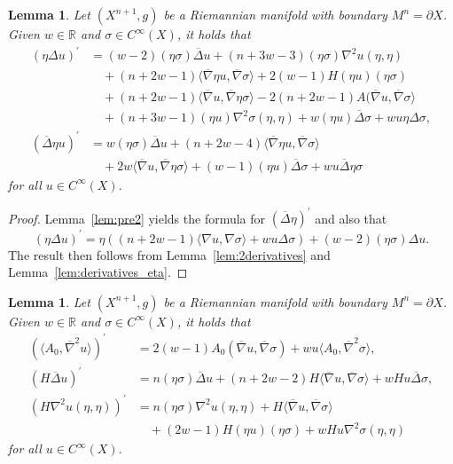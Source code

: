 \documentclass{amsart}
\newtheorem{lem}[thm]{Lemma}
\theoremstyle{definition}
\theoremstyle{remark}
\numberwithin{equation}{section}
\begin{document}
\begin{lem}
 \label{lem:pre33}
 Let $(X^{n+1},g)$ be a Riemannian manifold with boundary $M^n=\partial X$.  Given $w\in{\mathbb{R}}$ and $\sigma\in C^\infty(X)$, it holds that
 \begin{align*}
  \left(\eta\Delta u\right)^\prime & = (w-2)(\eta\sigma){\overline{\Delta}} u + (n+3w-3)(\eta\sigma)\nabla^2u(\eta,\eta) \\
   & \quad + (n+2w-1){\langle}{\overline{\nabla}}\eta u,{\overline{\nabla}}\sigma{\rangle} + 2(w-1)H(\eta u)(\eta\sigma) \\
   & \quad + (n+2w-1){\langle}{\overline{\nabla}} u,{\overline{\nabla}}\eta\sigma{\rangle} - 2(n+2w-1)A({\overline{\nabla}} u,{\overline{\nabla}}\sigma{\rangle} \\
   & \quad + (n+3w-1)(\eta u)\nabla^2\sigma(\eta,\eta) + w(\eta u){\overline{\Delta}}\sigma + wu\eta\Delta\sigma , \\
  \left({\overline{\Delta}}\eta u\right)^\prime & = w(\eta\sigma){\overline{\Delta}} u + (n+2w-4){\langle}{\overline{\nabla}}\eta u,{\overline{\nabla}}\sigma{\rangle} \\
   & \quad + 2w{\langle}{\overline{\nabla}} u,{\overline{\nabla}}\eta\sigma{\rangle} + (w-1)(\eta u){\overline{\Delta}}\sigma + wu{\overline{\Delta}}\eta\sigma
 \end{align*}
 for all $u\in C^\infty(X)$.
\end{lem}

\begin{proof}
 Lemma~\ref{lem:pre2} yields the formula for $({\overline{\Delta}}\eta)^\prime$ and also that
 \[ \left(\eta\Delta u\right)^\prime = \eta\left((n+2w-1){\langle}\nabla u,\nabla\sigma{\rangle} + wu\Delta\sigma\right) + (w-2)(\eta\sigma)\Delta u . \]
 The result then follows from Lemma~\ref{lem:2derivatives} and Lemma~\ref{lem:derivatives_eta}.
\end{proof}

\begin{lem}
 \label{lem:pre32}
 Let $(X^{n+1},g)$ be a Riemannian manifold with boundary $M^n=\partial X$.  Given $w\in{\mathbb{R}}$ and $\sigma\in C^\infty(X)$, it holds that
 \begin{align*}
  \left({\langle} A_0,{\overline{\nabla}}^2u{\rangle}\right)^\prime & = 2(w-1)A_0({\overline{\nabla}} u,{\overline{\nabla}}\sigma) + wu{\langle} A_0,{\overline{\nabla}}^2\sigma{\rangle}, \\
  \left(H{\overline{\Delta}} u\right)^\prime & = n(\eta\sigma){\overline{\Delta}} u + (n+2w-2)H{\langle}{\overline{\nabla}} u,{\overline{\nabla}}\sigma{\rangle} + wHu{\overline{\Delta}}\sigma, \\
  \left(H\nabla^2u(\eta,\eta)\right)^\prime & = n(\eta\sigma)\nabla^2u(\eta,\eta) + H{\langle}{\overline{\nabla}} u,{\overline{\nabla}}\sigma{\rangle} \\
   & \quad + (2w-1)H(\eta u)(\eta\sigma) + wHu\nabla^2\sigma(\eta,\eta)
 \end{align*}
 for all $u\in C^\infty(X)$.
\end{lem}
\end{document}
